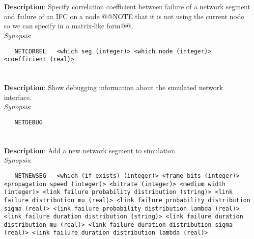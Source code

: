 \section{\quad{}}
\label{manpages:NETCORREL}
\label{manpages:netcorrel}
\vspace{-0.1in}
{\bf Description}: 	Specify correlation coefficient between failure of a network segment and failure of an IFC on a node @@NOTE that it is not using the current node so we can specify in a matrix-like form@@.\\[1.5ex]
{\em Synopsis}:
\vspace{-0.05in}
\scriptsize
\begin{lstlisting}
   NETCORREL   <which seg (integer)> <which node (integer)> <coefficient (real)>	
\end{lstlisting}
\normalsize
\vspace{-0.05in}


\section{\quad{}}
\label{manpages:NETDEBUG}
\label{manpages:netdebug}
\vspace{-0.1in}
{\bf Description}: 	Show debugging information about the simulated network interface.\\[1.5ex]
{\em Synopsis}:
\vspace{-0.05in}
\scriptsize
\begin{lstlisting}
   NETDEBUG   						
\end{lstlisting}
\normalsize
\vspace{-0.05in}


\section{\quad{}}
\label{manpages:NETNEWSEG}
\label{manpages:netnewseg}
\vspace{-0.1in}
{\bf Description}: 	Add a new network segment to simulation.\\[1.5ex]
{\em Synopsis}:
\vspace{-0.05in}
\scriptsize
\begin{lstlisting}
   NETNEWSEG   <which (if exists) (integer)> <frame bits (integer)> <propagation speed (integer)> <bitrate (integer)> <medium width (integer)> <link failure probability distribution (string)> <link failure distribution mu (real)> <link failure probability distribution sigma (real)> <link failure probability distribution lambda (real)> <link failure duration distribution (string)> <link failure duration distribution mu (real)> <link failure duration distribution sigma (real)> <link failure duration distribution lambda (real)>	
\end{lstlisting}
\normalsize
\vspace{-0.05in}


